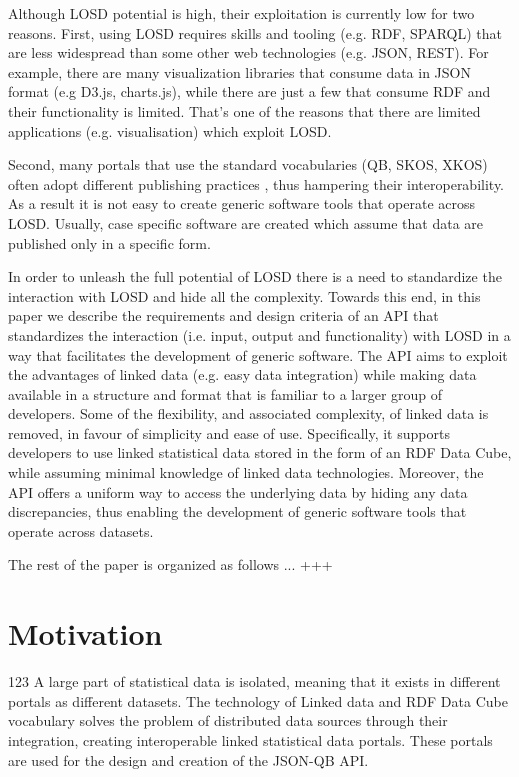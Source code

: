 \documentclass{llncs}
\begin{document}
Although LOSD potential is high, their exploitation is currently low for two reasons. First, using LOSD requires skills and tooling (e.g. RDF, SPARQL) that are less widespread than some other web technologies (e.g. JSON, REST). For example, there are many visualization libraries that consume data in JSON format (e.g D3.js, charts.js), while there are just a few that consume RDF and their functionality is limited. That's one of the reasons that there are limited applications (e.g. visualisation) which exploit LOSD.

Second, many portals that use the standard vocabularies (QB, SKOS, XKOS) often adopt different publishing practices \cite{KalampokisChallenges}, thus hampering their interoperability. As a result it is not easy to create generic software tools that operate across LOSD. Usually, case specific software \cite{KaramanouResultsSoFar} are created which assume that data are published only in a specific form. 

In order to unleash the full potential of LOSD there is a need to standardize the interaction with LOSD and hide all the complexity. Towards this end, in this paper we describe the requirements and design criteria of an API that standardizes the interaction (i.e. input, output and functionality) with LOSD in a way that facilitates the development of generic software. The API aims to exploit the advantages of linked data (e.g. easy data integration) while making data available in a structure and format that is familiar to a larger group of developers.  Some of the flexibility, and associated complexity, of linked data is removed, in favour of simplicity and ease of use. Specifically, it supports developers to use linked statistical data stored in the form of an RDF Data Cube, while assuming minimal knowledge of linked data technologies. Moreover, the API offers a uniform way to access the underlying data by hiding any data discrepancies, thus enabling the development of generic software tools that operate across datasets. 

The rest of the paper is organized as follows ... +++

\section{Motivation}\label{sec:motivation}

123 A large part of statistical data is isolated, meaning that it exists in different portals as different datasets. The technology of Linked data and RDF Data Cube vocabulary solves the problem of distributed data sources through their integration, creating interoperable linked statistical data portals. These portals are used for the design and creation of the JSON-QB API. 
 
\end{document}
